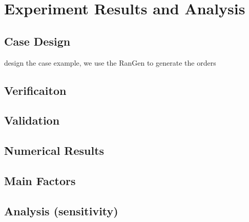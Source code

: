 \section{Experiment Results and Analysis} %
\label{sec:Experiment_results}

\subsection{Case Design} %
\label{ssub:case_design}
design the case example, we use the RanGen\cite{Demeulemeester2003,Vanhoucke2008} to generate the orders

\subsection{Verificaiton} %
\label{sub:verificaiton}

\subsection{Validation} %
\label{sub:validation}




\subsection{Numerical Results} %
\label{sub:effect_of_1}


\subsection{Main Factors} %
\label{sub:main_factors}


\subsection{Analysis (sensitivity)} %
\label{sub:analysis}

